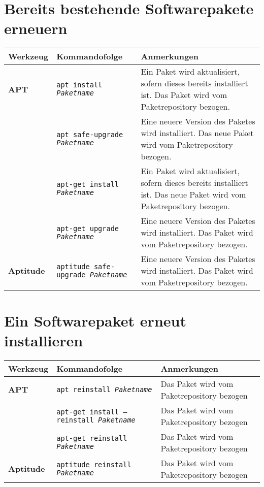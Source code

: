 \documentclass[10pt,a4paper]{article}
\begin{document}
\section{Bereits bestehende Softwarepakete erneuern}
\begin{tabular}{ p{3.5cm} p{9.6cm} p{11cm}}
  \hline
  \rowcolor{Gray}
  \textbf{Werkzeug} & \textbf{Kommandofolge} & \textbf{Anmerkungen} \\
  \hline 
  \textbf{APT} & \texttt{apt install \textit{Paketname}} & Ein Paket wird aktualisiert, sofern dieses bereits installiert ist. Das Paket wird vom Paketrepository bezogen. \\
  \rowcolor{Gray}
   & \texttt{apt safe-upgrade \textit{Paketname}} &  Eine neuere Version des Paketes wird installiert. Das neue Paket wird vom Paketrepository bezogen.\\
   & \texttt{apt-get install \textit{Paketname}} & Ein Paket wird aktualisiert, sofern dieses bereits installiert ist. Das neue Paket wird vom Paketrepository bezogen. \\
  \rowcolor{Gray}
   & \texttt{apt-get upgrade \textit{Paketname}} & Eine neuere Version des Paketes wird installiert. Das Paket wird vom Paketrepository bezogen.\\
  \textbf{Aptitude} & \texttt{aptitude safe-upgrade \textit{Paketname}} &  Eine neuere Version des Paketes wird installiert. Das Paket wird vom Paketrepository bezogen.\\
  \hline
\end{tabular}

\newpage

\cheatsheet

\section{Ein Softwarepaket erneut installieren}
\begin{tabular}{ p{3.5cm} p{9.6cm} p{11cm}}
  \hline
  \rowcolor{Gray}
  \textbf{Werkzeug} & \textbf{Kommandofolge} & \textbf{Anmerkungen} \\
  \hline 
  \textbf{APT} & \texttt{apt reinstall \textit{Paketname}} & Das Paket wird vom Paketrepository bezogen \\
  \rowcolor{Gray}
  & \texttt{apt-get install --reinstall \textit{Paketname}} & Das Paket wird vom Paketrepository bezogen \\
  & \texttt{apt-get reinstall \textit{Paketname}} & Das Paket wird vom Paketrepository bezogen \\
  \rowcolor{Gray}
  \textbf{Aptitude} & \texttt{aptitude reinstall \textit{Paketname}} & Das Paket wird vom Paketrepository bezogen \\
  \hline
\end{tabular}
\end{document}
